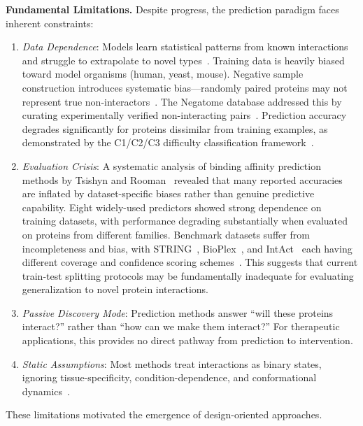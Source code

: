 \textbf{Fundamental Limitations.} Despite progress, the prediction paradigm faces inherent constraints:

\begin{enumerate}
    \item \textit{Data Dependence}: Models learn statistical patterns from known interactions and struggle to extrapolate to novel types~\cite{kewalramani2023state}. Training data is heavily biased toward model organisms (human, yeast, mouse). Negative sample construction introduces systematic bias---randomly paired proteins may not represent true non-interactors~\cite{smialowski2010negatome}. The Negatome database addressed this by curating experimentally verified non-interacting pairs~\cite{blohm2014negatome2}. Prediction accuracy degrades significantly for proteins dissimilar from training examples, as demonstrated by the C1/C2/C3 difficulty classification framework~\cite{park2015ppi}.
    
    \item \textit{Evaluation Crisis}: A systematic analysis of binding affinity prediction methods by Tsishyn and Rooman~\cite{bernett2024bias} revealed that many reported accuracies are inflated by dataset-specific biases rather than genuine predictive capability. Eight widely-used predictors showed strong dependence on training datasets, with performance degrading substantially when evaluated on proteins from different families. Benchmark datasets suffer from incompleteness and bias, with STRING~\cite{szklarczyk2021string}, BioPlex~\cite{huttlin2021bioplex}, and IntAct~\cite{orchard2014intact} each having different coverage and confidence scoring schemes~\cite{feng2022frameworks}. This suggests that current train-test splitting protocols may be fundamentally inadequate for evaluating generalization to novel protein interactions.
    
    \item \textit{Passive Discovery Mode}: Prediction methods answer ``will these proteins interact?'' rather than ``how can we make them interact?'' For therapeutic applications, this provides no direct pathway from prediction to intervention.
    
    \item \textit{Static Assumptions}: Most methods treat interactions as binary states, ignoring tissue-specificity, condition-dependence, and conformational dynamics~\cite{mcgary2010dynamic}.
\end{enumerate}

These limitations motivated the emergence of design-oriented approaches.

